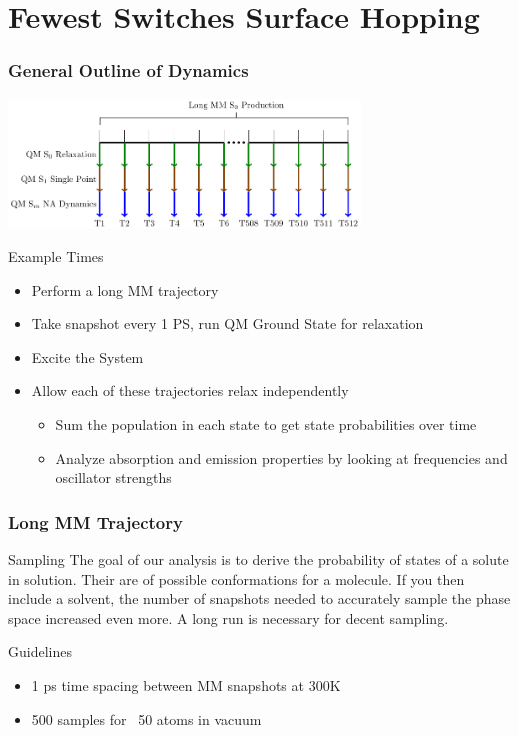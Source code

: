 \documentclass{beamer}
\begin{document}
\section{Fewest Switches Surface Hopping}
\begin{frame}
  \frametitle{General Outline of Dynamics}
  \includegraphics[width=0.7\textwidth]{Images/simulations}
\begin{block}{Example Times}
\begin{itemize}
    \item Perform a long MM trajectory
    \item Take snapshot every 1 PS, run QM Ground State for relaxation
    \item Excite the System
    \item Allow each of these trajectories relax independently
    \begin{itemize}
      \item Sum the population in each state to get state probabilities over time
      \item Analyze absorption and emission properties by looking at frequencies and oscillator strengths
    \end{itemize}
\end{itemize}

\end{block}
\end{frame}

\begin{frame}
  \frametitle{Long MM Trajectory}
\begin{block}{Sampling}
    The goal of our analysis is to derive the probability of states of a solute in solution.
    Their are of possible conformations for a molecule. If you
    then include a solvent, the number of snapshots needed to accurately sample
    the phase space increased even more. A long run is necessary for decent sampling.
\end{block}
\begin{block}{Guidelines}
 \begin{itemize}
  \item 1 ps time spacing between MM snapshots at 300K
  \item 500 samples for ~50 atoms in vacuum
 \end{itemize}
\end{block}
\end{frame}
\end{document}
